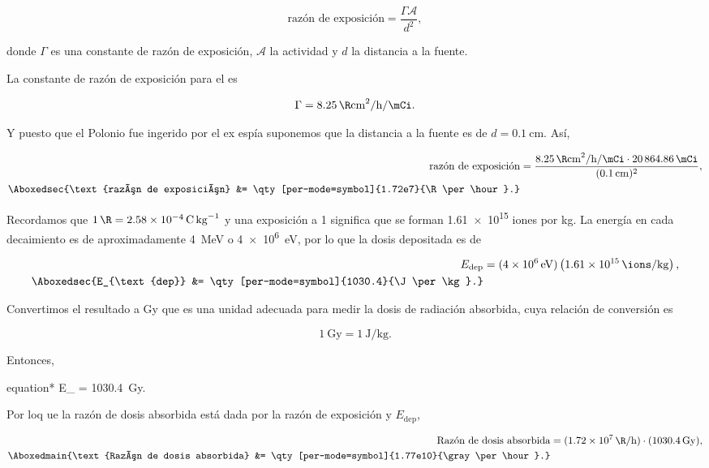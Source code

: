 \documentclass[./../main.tex]{subfiles}
\begin{document}
\begin{exercise}
\begin{solution}
			\begin{equation*}
				\text{razón de exposición} = \dfrac{\Gamma\mathcal{A}}{d^{2}},
			\end{equation*}

			donde \(\Gamma\) es una constante de razón de exposición, \(\mathcal{A}\) la actividad y \(d\) la distancia a la fuente.

			La constante de razón de exposición para el  es

			\begin{equation*}
				\Gamma = \qty[per-mode=symbol]{8.25}{\R\cm\tothe{2}\per\hour\per\mCi}.
			\end{equation*}

			Y puesto que el Polonio fue ingerido por el ex espía suponemos que la distancia a la fuente es de \(d = \qty{0.1}{\cm}\). Así,

			\begin{align*}
				\text{razón de exposición} &= \dfrac{\qty[per-mode=symbol]{8.25}{\R\cm\tothe{2}\per\hour\per\mCi}\cdot\qty{20864.86}{\mCi}}{(\qty{0.1}{\cm})^{2}},\\
				\Aboxedsec{\text{razón de exposición} &= \qty[per-mode=symbol]{1.72e7}{\R\per\hour}.}
			\end{align*}

			Recordamos que \(\qty{1}{\R} = \qty{2.58e-4}{\C\per\kg}\) y una exposición a \qty{1}{\R} significa que se forman \num{1.61e15} iones por \unit{\kg}. La energía en cada decaimiento es de aproximadamente \qty{4}{\MeV} o \qty{4e6}{\eV}, por lo que la dosis depositada es de

			\begin{align*}
				E_{\text{dep}} &= (\qty{4e6}{\eV})\left(\qty{1.61e15}{\ions\per\kg}\right),\\
				\Aboxedsec{E_{\text{dep}} &= \qty[per-mode=symbol]{1030.4}{\J\per\kg}.} 
			\end{align*}

			Convertimos el resultado a \unit{\gray} que es una unidad adecuada para medir la dosis de radiación absorbida, cuya relación de conversión es

			\begin{equation*}
				\qty{1}{\gray} = \qty{1}{\J\per\kg}.
			\end{equation*}

			Entonces,

			\begin{empheq}[box = \secbox]{equation*}
				E_{} = \qty{1030.4}{\gray}.
			\end{empheq}

			Por loq ue la razón de dosis absorbida está dada por la razón de exposición y \(E_{\text{dep}}\),

			\begin{align*}
				\text{Razón de dosis absorbida} &= (\qty[per-mode=symbol]{1.72e7}{\R\per\hour})\cdot(\qty{1030.4}{\gray}),\\
				\Aboxedmain{\text{Razón de dosis absorbida} &= \qty[per-mode=symbol]{1.77e10}{\gray\per\hour}.}
			\end{align*}
		\end{solution}
	\end{exercise}
\end{document}
